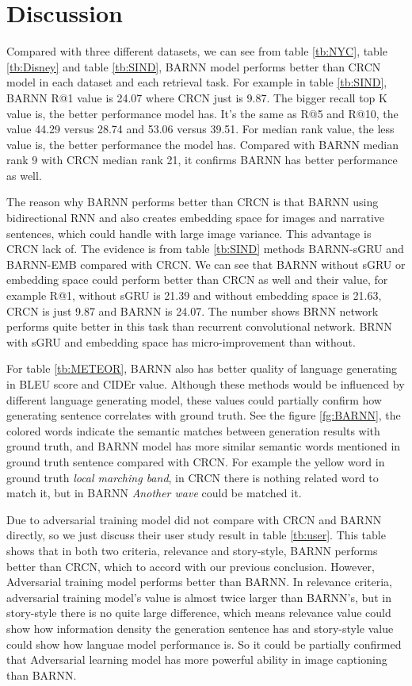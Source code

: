 \documentclass[11pt]{article}
\begin{document}
\section{Discussion}
Compared with three different datasets, we can see from table \ref{tb:NYC}, table \ref{tb:Disney} and table \ref{tb:SIND}, BARNN model performs better than CRCN model in each dataset and each retrieval task. For example in table \ref{tb:SIND}, BARNN R@1 value is 24.07 where CRCN just is 9.87. The bigger recall top K value is, the better performance model has. It's the same as R@5 and R@10, the value 44.29 versus 28.74 and 53.06 versus 39.51. For median rank value, the less value is, the better performance the model has. Compared with BARNN median rank 9 with CRCN median rank 21, it confirms BARNN has better performance as well. 

The reason why BARNN performs better than CRCN is that BARNN using bidirectional RNN and also creates embedding space for images and narrative sentences, which could handle with large image variance. This advantage is CRCN lack of. The evidence is from table \ref{tb:SIND} methods BARNN-sGRU and BARNN-EMB compared with CRCN.  We can see that BARNN without sGRU or embedding space could perform better than CRCN as well and their value, for example R@1, without sGRU is 21.39 and without embedding space is 21.63, CRCN is just 9.87 and BARNN is 24.07. The number shows BRNN network performs quite better in this task than recurrent convolutional network. BRNN with sGRU and embedding space has micro-improvement than without.

For table \ref{tb:METEOR}, BARNN also has better quality of language generating in BLEU score and CIDEr value. Although these methods would be influenced by different language generating model, these values could partially confirm how generating sentence correlates with ground truth. See the figure \ref{fg:BARNN}, the colored words indicate the semantic matches between generation results with ground truth, and BARNN model has more similar semantic words mentioned in ground truth sentence compared with CRCN. For example the yellow word in ground truth \textit{local marching band}, in CRCN there is nothing related word to match it, but in BARNN \textit{Another wave} could be matched it.

Due to adversarial training model did not compare with CRCN and BARNN directly, so we just discuss their user study result in table \ref{tb:user}. This table shows that in both two criteria, relevance and story-style, BARNN performs better than CRCN, which to accord with our previous conclusion. However, Adversarial training model performs better than BARNN. In relevance criteria, adversarial training model's value is almost twice larger than BARNN's, but in story-style there is no quite large difference, which means relevance value could show how information density the generation sentence has and story-style value could show how languae model performance is. So it could be partially confirmed that Adversarial learning model has more powerful ability in image captioning than BARNN.
\end{document}
